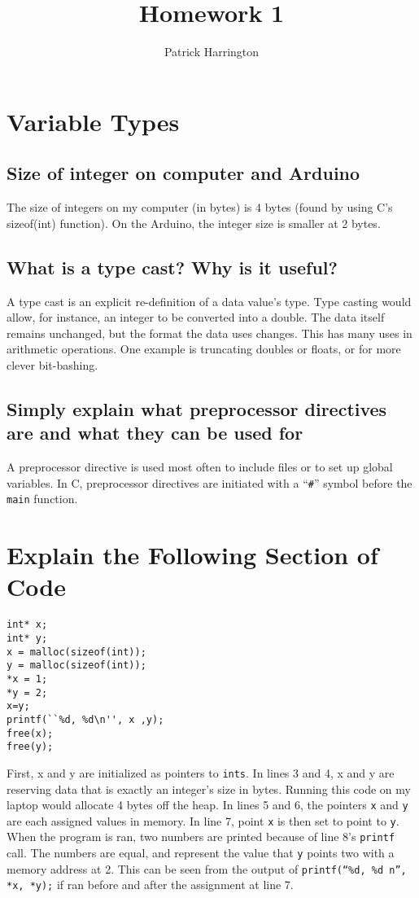 \documentclass{hw}
\title{Homework 1}
\author{Patrick Harrington}
\begin{document}
\maketitle
\section{Variable Types}
\subsection{Size of integer on computer and Arduino}
The size of integers on my computer (in bytes) is 4 bytes (found by using C's
sizeof(int) function). On the Arduino, the integer size is smaller at 2 bytes.
\subsection{What is a type cast? Why is it useful?}
A type cast is an explicit re-definition of a data value's type. Type casting
would allow, for instance, an integer to be converted into a double. The data
itself remains unchanged, but the format the data uses changes. This has
many uses in arithmetic operations. One example is truncating doubles or
floats, or for more clever bit-bashing.
\subsection{Simply explain what preprocessor directives are and what they can
be used for}
A preprocessor directive is used most often to include files or to set up
global variables. In C, preprocessor directives are initiated with a
``\texttt{\#}''
symbol before the \texttt{main} function.
\section{Explain the Following Section of Code}
\begin{lstlisting}
int* x;
int* y;
x = malloc(sizeof(int));
y = malloc(sizeof(int));
*x = 1;
*y = 2;
x=y;
printf(``%d, %d\n'', x ,y);
free(x);
free(y);
\end{lstlisting}

First, x and y are initialized as pointers to \texttt{ints}. In lines 3 and 4,
x and y are reserving data that is exactly an integer's size in bytes. Running
this code on my laptop would allocate 4 bytes off the heap. In lines 5 and 6,
the pointers \texttt{x} and \texttt{y} are each assigned values in memory. In
line 7, point \texttt{x} is then set to point to \texttt{y}. When the program
is ran, two numbers are printed because of line 8's \texttt{printf} call. The
numbers are equal, and represent the value that \texttt{y} points two
with a memory address at 2. This can be seen from the output of
\texttt{printf(``\%d, \%d\\n'', *x, *y);} if ran before and after the
assignment at line 7.
\end{document}
